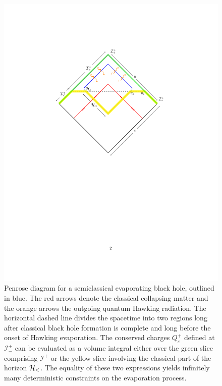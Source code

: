 \documentclass[12pt]{article}
\numberwithin{equation}{section}
\def\e{{\epsilon}}
\def\ci{{\mathcal I}}
\def\ch{{\cal H}}
\renewcommand{\epsilon}{\varepsilon}
\begin{document}
\begin{figure}
\begin{center}
\includegraphics{image2}
\end{center}
\caption{Penrose diagram for a semiclassical  evaporating black hole, outlined in blue. The red arrows denote the classical collapsing matter and the orange arrows the outgoing quantum Hawking radiation. The horizontal dashed line divides the spacetime into two regions  long after classical black hole formation is complete and long before the onset of Hawking evaporation. The conserved charges $Q^+_\e$ defined at $\ci^+_-$ can be evaluated as a volume integral either over the green slice comprising $\ci^+$ or the yellow slice involving the classical part of the horizon $\ch_<$. The equality of these two expressions yields infinitely many deterministic constraints on the evaporation process. }\label{figtwo}
\end{figure}
\end{document}
